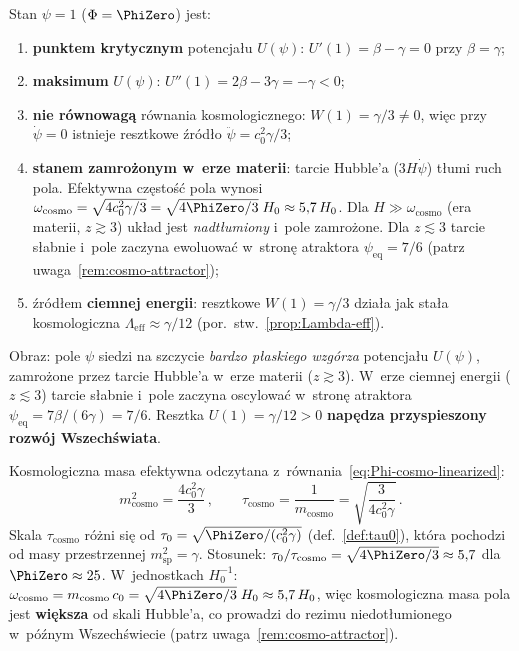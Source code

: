 \begin{remark}[Status $\psi = 1$: stan zamro\.zony, nie minimum]%
\label{rem:psi1-status}
Stan $\psi = 1$ ($\Phi = \PhiZero$) jest:
\begin{enumerate}[nosep]
  \item \textbf{punktem krytycznym} potencja\l{}u $U(\psi)$:
    $U'(1) = \beta - \gamma = 0$ przy $\beta = \gamma$;
  \item \textbf{maksimum} $U(\psi)$:
    $U''(1) = 2\beta - 3\gamma = -\gamma < 0$;
  \item \textbf{nie r\'ownowag\k{a}} r\'ownania kosmologicznego:
    $W(1) = \gamma/3 \neq 0$, wi\k{e}c przy $\dot\psi = 0$
    istnieje resztkowe \'zr\'od\l{}o $\ddot\psi = c_0^2\gamma/3$;
  \item \textbf{stanem zamro\.zonym w~erze materii}: tarcie Hubble'a ($3H\dot\psi$)
    t\l{}umi ruch pola. Efektywna cz\k{e}sto\'s\'c pola wynosi
    $\omega_{\mathrm{cosmo}} = \sqrt{4c_0^2\gamma/3}
    = \sqrt{4\PhiZero/3}\;H_0 \approx 5{,}7\,H_0$.
    Dla $H \gg \omega_{\mathrm{cosmo}}$ (era materii, $z \gtrsim 3$)
    uk\l{}ad jest \emph{nadt\l{}umiony} i~pole zamro\.zone.
    Dla $z \lesssim 3$ tarcie s\l{}abnie i~pole zaczyna
    ewoluowa\'c w~stron\k{e} atraktora $\psi_{\mathrm{eq}} = 7/6$
    (patrz uwaga~\ref{rem:cosmo-attractor});
  \item \'zr\'od\l{}em \textbf{ciemnej energii}: resztkowe
    $W(1) = \gamma/3$ dzia\l{}a jak sta\l{}a kosmologiczna
    $\Lambda_{\mathrm{eff}} \approx \gamma/12$ (por.\
    stw.~\ref{prop:Lambda-eff}).
\end{enumerate}
Obraz: pole $\psi$ siedzi na szczycie \emph{bardzo p\l{}askiego wzg\'orza}
potencja\l{}u $U(\psi)$, zamro\.zone przez tarcie Hubble'a
w~erze materii ($z \gtrsim 3$). W~erze ciemnej energii
($z \lesssim 3$) tarcie s\l{}abnie i~pole zaczyna oscylowa\'c
w~stron\k{e} atraktora $\psi_{\mathrm{eq}} = 7\beta/(6\gamma) = 7/6$.
Resztka $U(1) = \gamma/12 > 0$
\textbf{nap\k{e}dza przyspieszony rozw\'oj Wszech\'swiata}.
\end{remark}

\begin{remark}\label{rem:tau0-cosmo}
Kosmologiczna masa efektywna odczytana
z~r\'ownania~\eqref{eq:Phi-cosmo-linearized}:
\begin{equation}\label{eq:m-cosmo-exact}
  m_{\mathrm{cosmo}}^2 = \frac{4c_0^2\gamma}{3}\,,
  \qquad
  \tau_{\mathrm{cosmo}} = \frac{1}{m_{\mathrm{cosmo}}}
  = \sqrt{\frac{3}{4c_0^2\gamma}}\,.
\end{equation}
Skala $\tau_{\mathrm{cosmo}}$ r\'o\.zni si\k{e}
od $\tau_0 = \sqrt{\PhiZero/(c_0^2\gamma)}$
(def.~\ref{def:tau0}), kt\'ora pochodzi od masy przestrzennej
$m_{\mathrm{sp}}^2 = \gamma$.
Stosunek: $\tau_0/\tau_{\mathrm{cosmo}}
= \sqrt{4\PhiZero/3} \approx 5{,}7$ dla $\PhiZero \approx 25$.
W~jednostkach $H_0^{-1}$:
$\omega_{\mathrm{cosmo}} = m_{\mathrm{cosmo}}\,c_0
= \sqrt{4\PhiZero/3}\;H_0 \approx 5{,}7\,H_0$,
wi\k{e}c kosmologiczna masa pola jest \textbf{wi\k{e}ksza}
od skali Hubble'a, co prowadzi do rezimu niedot\l{}umionego
w~p\'o\'znym Wszech\'swiecie (patrz uwaga~\ref{rem:cosmo-attractor}).
\end{remark}

